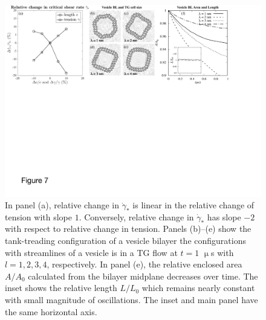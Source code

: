 \documentclass[prb,preprint,showpacs,preprintnumbers,amsmath,amssymb,longbibliography]{revtex4-1}
\begin{document}
\begin{figure}[t]
\begin{center}
  \includegraphics[width=\textwidth]{critical_shear_and_cell_size.pdf}
\end{center}
\caption{\label{fig:PramChange}
In panel (a), relative change in $\dot \gamma_*$ is linear 
in the relative change of tension with slope $1$.
Conversely, relative change in $\dot \gamma_*$ 
has slope $-2$ with respect to relative change in tension.
Panels (b)--(e) show the tank-treading configuration 
of a vesicle bilayer the configurations with streamlines of a vesicle is in a TG flow at
$t=1$ $\upmu$s with $l= 1,2,3,4$, respectively. In panel (e), the
  relative enclosed area $A/A_0$ calculated from the bilayer midplane
  decreases over time. The inset shows the relative length $L/L_0$ which
  remains nearly constant with small magnitude of oscillations. The
  inset and main panel have the same horizontal axis.}
\end{figure}
\end{document}

